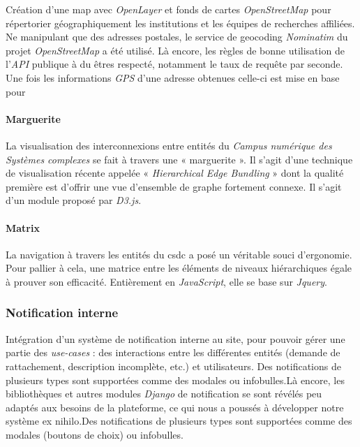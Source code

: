 \documentclass[french, 11pt]{memoir}
\begin{document}
Création d'une map avec \emph{OpenLayer} et fonds de cartes
\emph{OpenStreetMap} pour répertorier géographiquement les institutions
et les équipes de recherches affiliées. Ne manipulant que des adresses
postales, le service de geocoding \emph{Nominatim} du projet
\emph{OpenStreetMap} a été utilisé. Là encore, les règles de bonne
utilisation de l'\emph{API} publique à du êtres respecté, notamment le
taux de requête par seconde. Une fois les informations \emph{GPS} d'une
adresse obtenues celle-ci est mise en base pour

\paragraph{Marguerite}\label{marguerite}

La visualisation des interconnexions entre entités du \emph{Campus
	numérique des Systèmes complexes} se fait à travers une « marguerite ».
Il s'agit d'une technique de visualisation récente appelée «
\emph{Hierarchical Edge Bundling} » dont la qualité première est
d'offrir une vue d'ensemble de graphe fortement connexe. Il s'agit d'un
module proposé par \emph{D3.js}.

\paragraph{Matrix}\label{matrix}

La navigation à travers les entités du csdc a posé un véritable souci
d'ergonomie. Pour pallier à cela, une matrice entre les éléments de
niveaux hiérarchiques égale à prouver son efficacité. Entièrement en
\emph{JavaScript}, elle se base sur \emph{Jquery}.

\subsubsection{Notification interne}\label{notification-interne}

Intégration d'un système de notification interne au site, pour pouvoir
gérer une partie des \emph{use-cases} : des interactions entre les
différentes entités (demande de rattachement, description incomplète,
etc.) et utilisateurs. Des notifications de plusieurs types sont
supportées comme des modales ou infobulles.Là encore, les bibliothèques
et autres modules \emph{Django} de notification se sont révélés peu
adaptés aux besoins de la plateforme, ce qui nous a poussés à développer
notre système ex nihilo.Des notifications de plusieurs types sont
supportées comme des modales (boutons de choix) ou infobulles.
\end{document}
